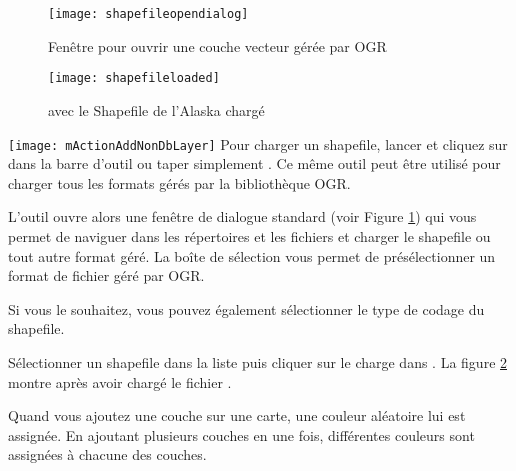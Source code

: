 \begin{figure}[ht]
  \begin{center} 
  \texttt{[image: shapefileopendialog]}
  \caption{Fenêtre pour ouvrir une couche vecteur gérée par OGR \nixcaption}\label{fig:openshapefile}
\end{center}
\end{figure}

\begin{figure}[ht]
  \begin{center}
  \texttt{[image: shapefileloaded]}
    \caption{\qg avec le Shapefile de l'Alaska chargé \nixcaption}\label{fig:loadedshapefile}
\end{center}
\end{figure}

\texttt{[image: mActionAddNonDbLayer]} Pour charger un shapefile, lancer \qg et cliquez sur  dans la barre d'outil ou taper simplement . Ce même outil peut être utilisé pour charger tous les formats gérés par la bibliothèque OGR.
\par
L'outil ouvre alors une fenêtre de dialogue standard (voir Figure \ref{fig:openshapefile}) qui vous permet de naviguer dans les répertoires et les fichiers et charger le shapefile ou tout autre format géré.
La boîte de sélection  vous permet de présélectionner un format de fichier géré par OGR.
\par
Si vous le souhaitez, vous pouvez également sélectionner le type de codage du shapefile.
\par
Sélectionner un shapefile dans la liste puis cliquer sur  le charge dans \qg. La figure \ref{fig:loadedshapefile} montre \qg après avoir chargé le fichier .

\begin{Tip}\caption{\textsc{Couleurs de couches}}
Quand vous ajoutez une couche sur une carte, une couleur aléatoire lui est assignée. En ajoutant plusieurs couches en une fois, différentes couleurs sont assignées à chacune des couches.
\end{Tip}


